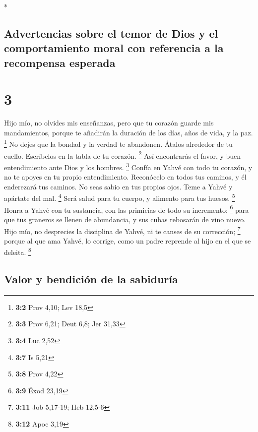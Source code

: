 \begin{paracol}{2}
\begin{otherlanguage}{english}
\end{otherlanguage}

\switchcolumn[0]*

\hypertarget{advertencias-sobre-el-temor-de-dios-y-el-comportamiento-moral-con-referencia-a-la-recompensa-esperada}{%
\subsection{Advertencias sobre el temor de Dios y el comportamiento
moral con referencia a la recompensa
esperada}\label{advertencias-sobre-el-temor-de-dios-y-el-comportamiento-moral-con-referencia-a-la-recompensa-esperada}}

\hypertarget{section-4}{%
\section{3}\label{section-4}}

 Hijo mío, no olvides mis enseñanzas, pero que tu corazón
guarde mis mandamientos,  porque te añadirán la duración
de los días, años de vida, y la paz. \footnote{\textbf{3:2} Prov 4,10;
  Lev 18,5}  No dejes que la bondad y la verdad te
abandonen. Átalos alrededor de tu cuello. Escríbelos en la tabla de tu
corazón. \footnote{\textbf{3:3} Prov 6,21; Deut 6,8; Jer 31,33}
 Así encontrarás el favor, y buen entendimiento ante Dios
y los hombres. \footnote{\textbf{3:4} Luc 2,52}  Confía en
Yahvé con todo tu corazón, y no te apoyes en tu propio entendimiento.
 Reconócelo en todos tus caminos, y él enderezará tus
caminos.  No seas sabio en tus propios ojos. Teme a Yahvé
y apártate del mal. \footnote{\textbf{3:7} Is 5,21}  Será
salud para tu cuerpo, y alimento para tus huesos. \footnote{\textbf{3:8}
  Prov 4,22}  Honra a Yahvé con tu sustancia, con las
primicias de todo su incremento; \footnote{\textbf{3:9} Éxod 23,19}
 para que tus graneros se llenen de abundancia, y sus
cubas rebosarán de vino nuevo.  Hijo mío, no desprecies
la disciplina de Yahvé, ni te canses de su corrección; \footnote{\textbf{3:11}
  Job 5,17-19; Heb 12,5-6}  porque al que ama Yahvé, lo
corrige, como un padre reprende al hijo en el que se deleita.
\footnote{\textbf{3:12} Apoc 3,19}

\hypertarget{valor-y-bendiciuxf3n-de-la-sabiduruxeda}{%
\subsection{Valor y bendición de la
sabiduría}\label{valor-y-bendiciuxf3n-de-la-sabiduruxeda}}


\end{paracol}
